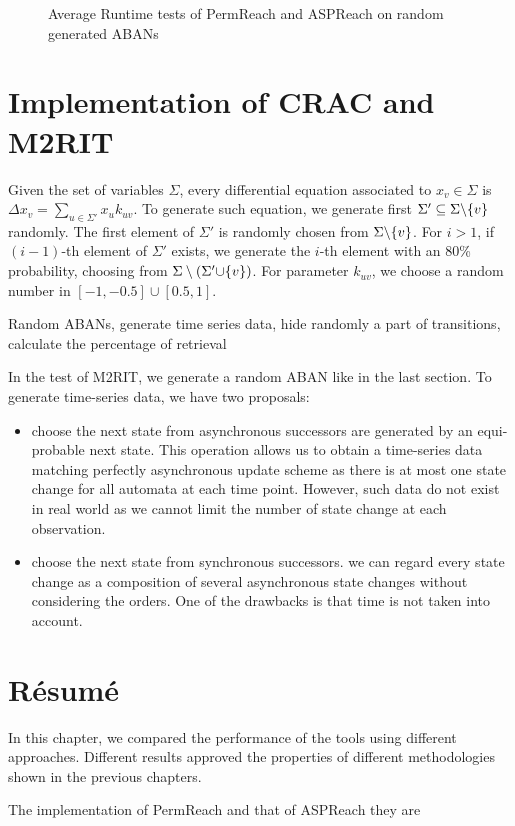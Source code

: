 \begin{figure}[ht]
    \caption[Runtime tests of reachability analyzers]{Average Runtime tests of PermReach and ASPReach on random generated ABANs}
\end{figure}

\section{Implementation of CRAC and M2RIT}

Given the set of variables $\Sigma$, every differential equation associated to $x_v\in \Sigma$ is $\Delta x_v=\sum_{u\in \Sigma'}x_u k_{uv}$. 
To generate such equation, we generate first $\Sigma'\subseteq \Sigma\miset{v}$ randomly.
The first element of $\Sigma'$ is randomly chosen from $\Sigma\miset{v}$.
For $i>1$, if $(i-1)$-th element of $\Sigma'$ exists, we generate the $i$-th element with an 80\% probability, choosing from $\Sigma\setminus(\Sigma'\addset{v})$.
For parameter $k_{uv}$, we choose a random number in $[-1,-0.5]\cup[0.5,1]$.

Random ABANs, generate time series data, hide randomly a part of transitions, calculate the percentage of retrieval

In the test of M2RIT, we generate a random ABAN like in the last section.
To generate time-series data, we have two proposals:
\begin{itemize}
    \item choose the next state from asynchronous successors are generated by an equi-probable next state.
    This operation allows us to obtain a time-series data matching perfectly asynchronous update scheme as there is at most one state change for all automata at each time point. 
    However, such data do not exist in real world as we cannot limit the number of state change at each observation.
    \item choose the next state from synchronous successors.
    we can regard every state change as a composition of several asynchronous state changes without considering the orders.
    One of the drawbacks is that time is not taken into account.
\end{itemize}

\section{R\'esum\'e}

In this chapter, we compared the performance of the tools using different approaches.
Different results approved the properties of different methodologies shown in the previous chapters.

The implementation of PermReach and that of ASPReach they are 
